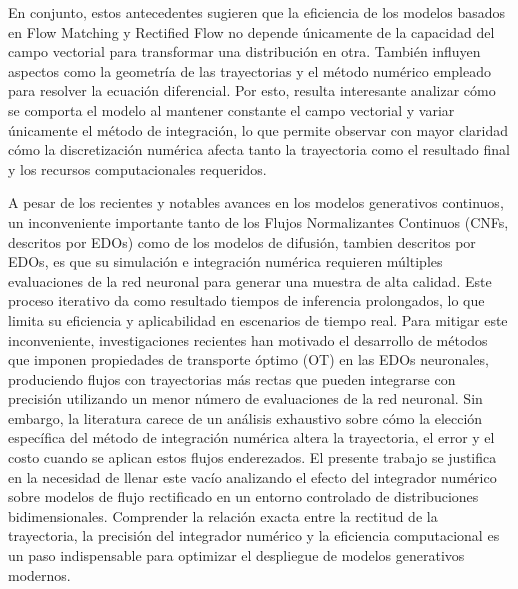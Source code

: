 \documentclass[final,5p,times,twocolumn,authoryear]{elsarticle}
\begin{document}
En conjunto, estos antecedentes sugieren que la eficiencia de los modelos basados en Flow Matching y Rectified Flow no depende únicamente de la capacidad del campo vectorial para transformar una distribución en otra. También influyen aspectos como la geometría de las trayectorias y el método numérico empleado para resolver la ecuación diferencial. Por esto, resulta interesante analizar cómo se comporta el modelo al mantener constante el campo vectorial y variar únicamente el método de integración, lo que permite observar con mayor claridad cómo la discretización numérica afecta tanto la trayectoria como el resultado final y los recursos computacionales requeridos.


A pesar de los recientes y notables avances en los modelos generativos continuos, un inconveniente importante tanto de los Flujos Normalizantes Continuos (CNFs, descritos por EDOs) como de los modelos de difusión, tambien descritos por EDOs, es que su simulación e integración numérica requieren múltiples evaluaciones de la red neuronal para generar una muestra de alta calidad. Este proceso iterativo da como resultado tiempos de inferencia prolongados, lo que limita su eficiencia y aplicabilidad en escenarios de tiempo real. Para mitigar este inconveniente, investigaciones recientes han motivado el desarrollo de métodos que imponen propiedades de transporte óptimo (OT) en las EDOs neuronales, produciendo flujos con trayectorias más rectas que pueden integrarse con precisión utilizando un menor número de evaluaciones de la red neuronal. Sin embargo, la literatura carece de un análisis exhaustivo sobre cómo la elección específica del método de integración numérica altera la trayectoria, el error y el costo cuando se aplican estos flujos enderezados. El presente trabajo se justifica en la necesidad de llenar este vacío analizando el efecto del integrador numérico sobre modelos de flujo rectificado en un entorno controlado de distribuciones bidimensionales. Comprender la relación exacta entre la rectitud de la trayectoria, la precisión del integrador numérico y la eficiencia computacional es un paso indispensable para optimizar el despliegue de modelos generativos modernos.
\end{document}
